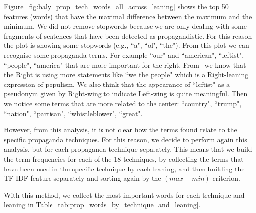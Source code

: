 Figure~\ref{fig:baly_prop_tech_words_all_across_leaning} shows the top 50 features (words) that have the maximal difference between the maximum and the minimum.
We did not remove stopwords because we are only dealing with some fragments of sentences that have been detected as propagandistic. For this reason the plot is showing some stopwords (e.g., ``a", ``of", ``the").
From this plot we can recognise some propaganda terms.
For example ``our" and ``american", ``leftist", ``people", ``america" that are more important for the right. From~\citet{seargeant2020art} we know that the Right is using more statements like ``we the people" which is a Right-leaning expression of populism. We also think that the appearance of ``leftist" as a pseudonym given by Right-wing to indicate Left-wing is quite meaningful.
Then we notice some terms that are more related to the center: ``country", ``trump", ``nation", ``partisan", ``whistleblower", ``great".

However, from this analysis, it is not clear how the terms found relate to the specific propaganda techniques. For this reason, we decide to perform again this analysis, but for each propaganda technique separately.
This means that we build the term frequencies for each of the 18 techniques, by collecting the terms that have been used in the specific technique by each leaning, and then building the TF-IDF feature separately and sorting again by the $(max - min)$ criterion.

With this method, we collect the most important words for each technique and leaning in Table~\ref{tab:prop_words_by_technique_and_leaning}.

